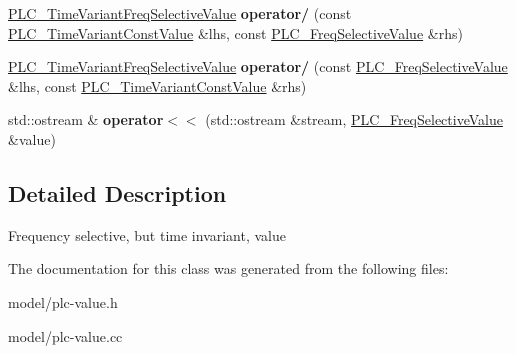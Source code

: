 \begin{DoxyCompactItemize}
\item 
\hypertarget{classns3_1_1PLC__FreqSelectiveValue_a0655c0e755a478cc0b4f5a1c23c9efd9}{\hyperlink{classns3_1_1PLC__TimeVariantFreqSelectiveValue}{\-P\-L\-C\-\_\-\-Time\-Variant\-Freq\-Selective\-Value} {\bfseries operator/} (const \hyperlink{classns3_1_1PLC__TimeVariantConstValue}{\-P\-L\-C\-\_\-\-Time\-Variant\-Const\-Value} \&lhs, const \hyperlink{classns3_1_1PLC__FreqSelectiveValue}{\-P\-L\-C\-\_\-\-Freq\-Selective\-Value} \&rhs)}\label{classns3_1_1PLC__FreqSelectiveValue_a0655c0e755a478cc0b4f5a1c23c9efd9}

\item 
\hypertarget{classns3_1_1PLC__FreqSelectiveValue_ac83aa895ecbeab5a39607bac5dfdd80a}{\hyperlink{classns3_1_1PLC__TimeVariantFreqSelectiveValue}{\-P\-L\-C\-\_\-\-Time\-Variant\-Freq\-Selective\-Value} {\bfseries operator/} (const \hyperlink{classns3_1_1PLC__FreqSelectiveValue}{\-P\-L\-C\-\_\-\-Freq\-Selective\-Value} \&lhs, const \hyperlink{classns3_1_1PLC__TimeVariantConstValue}{\-P\-L\-C\-\_\-\-Time\-Variant\-Const\-Value} \&rhs)}\label{classns3_1_1PLC__FreqSelectiveValue_ac83aa895ecbeab5a39607bac5dfdd80a}

\item 
\hypertarget{classns3_1_1PLC__FreqSelectiveValue_a64b2ca968a1db457f4c26f757c069d1d}{std\-::ostream \& {\bfseries operator$<$$<$} (std\-::ostream \&stream, \hyperlink{classns3_1_1PLC__FreqSelectiveValue}{\-P\-L\-C\-\_\-\-Freq\-Selective\-Value} \&value)}\label{classns3_1_1PLC__FreqSelectiveValue_a64b2ca968a1db457f4c26f757c069d1d}

\end{DoxyCompactItemize}


\subsection{\-Detailed \-Description}
\-Frequency selective, but time invariant, value 

\-The documentation for this class was generated from the following files\-:\begin{DoxyCompactItemize}
\item 
model/plc-\/value.\-h\item 
model/plc-\/value.\-cc\end{DoxyCompactItemize}
